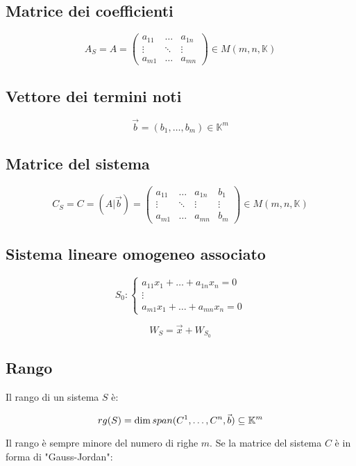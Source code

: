\documentclass{article}
\begin{document}
\subsection{Matrice dei coefficienti}

$$
A_S = A =
\begin{pmatrix}
a_{11} & \dots & a_{1n}\\
\vdots & \ddots & \vdots\\
a_{m1} & \dots & a_{mn}
\end{pmatrix}
\in M(m,n,\mathbb{K})
$$

\subsection{Vettore dei termini noti}

$$
\vec{b} = (b_1, \dots, b_m) \in \mathbb{K}^m
$$

\subsection{Matrice del sistema}

$$
C_S = C = ( A | \vec{b} ) =
\begin{pmatrix}
a_{11} & \dots & a_{1n} & b_1\\
\vdots & \ddots & \vdots & \vdots\\
a_{m1} & \dots & a_{mn} & b_m
\end{pmatrix}
\in M(m,n,\mathbb{K})
$$

\subsection{Sistema lineare omogeneo associato}

$$
S_0: \begin{cases}
a_{11} x_1 + \dots + a_{1n} x_n = 0\\
\vdots\\
a_{m1} x_1 + \dots + a_{mn} x_n = 0
\end {cases}
$$

$$
W_S = \vec{x} + W_{S_0}
$$

\subsection{Rango}

Il rango di un sistema $S$ è:

$$
rg(S)= \dim \space span(C^1, \dots, C^n, \vec{b}) \subseteq \mathbb{K}^m
$$

\noindent
Il rango è sempre minore del numero di righe $m$.
Se la matrice del sistema $C$ è in forma di "Gauss-Jordan":
\end{document}
